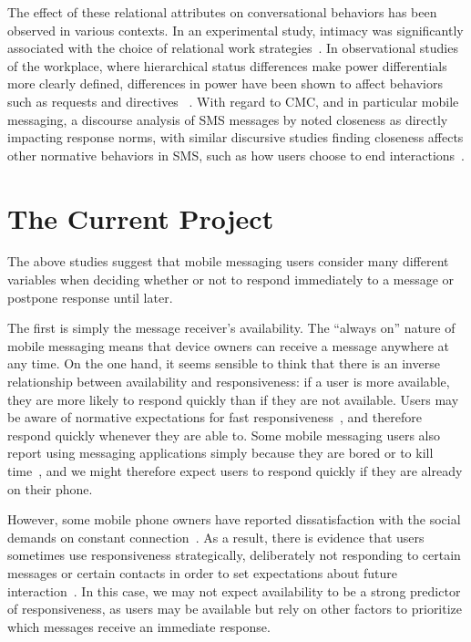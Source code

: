 \documentclass[12pt]{nuthesis}	%
\begin{document}
The effect of these relational attributes on conversational behaviors has been observed in various contexts. In an experimental study, intimacy was significantly associated with the choice of relational work strategies~\citep{meyer2004repairing}. In observational studies of the workplace, where hierarchical status differences make power differentials more clearly defined, differences in power have been shown to affect behaviors such as requests and directives~\citep{craven2010directives,vine2009directives} . With regard to CMC, and in particular mobile messaging, a discourse analysis of SMS messages by \citet{laursen2005please} noted closeness as directly impacting response norms, with similar discursive studies finding closeness affects other normative behaviors in SMS, such as how users choose to end interactions~\citep{spilioti2011beyond}.

\chapter{The Current Project}

The above studies suggest that mobile messaging users consider many different variables when deciding whether or not to respond immediately to a message or postpone response until later.

The first is simply the message receiver's availability. The ``always on'' nature of mobile messaging means that device owners can receive a message anywhere at any time. On the one hand, it seems sensible to think that there is an inverse relationship between availability and responsiveness: if a user is more available, they are more likely to respond quickly than if they are not available. Users may be aware of normative expectations for fast responsiveness~\citep{church2013s,rettie2009mobile}, and therefore respond quickly whenever they are able to. Some mobile messaging users also report using messaging applications simply because they are bored or to kill time~\citep{battestini2010large}, and we might therefore expect users to respond quickly if they are already on their phone.

However, some mobile phone owners have reported dissatisfaction with the social demands on constant connection~\citep{ames2013managing}. As a result, there is evidence that users sometimes use responsiveness strategically, deliberately not responding to certain messages or certain contacts in order to set expectations about future interaction~\citep{wohn2015ambient}. In this case, we may not expect availability to be a strong predictor of responsiveness, as users may be available but rely on other factors to prioritize which messages receive an immediate response.
\end{document}
